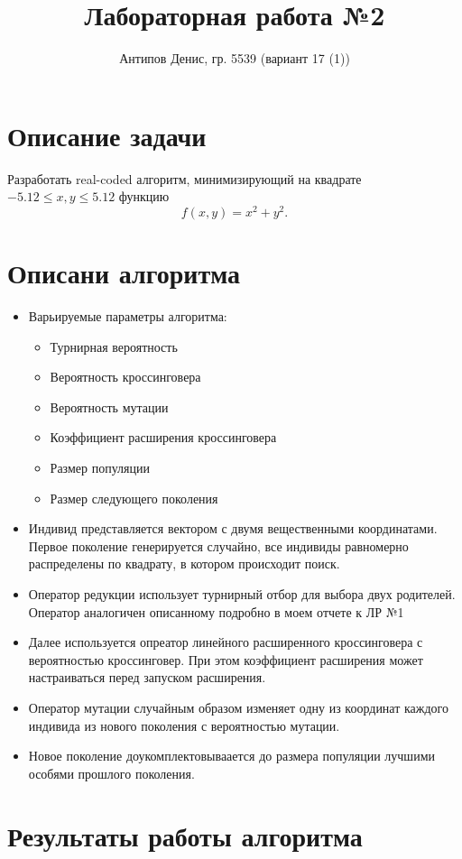 \documentclass[a4paper]{article}
\title{Лабораторная работа №2}
\author{Антипов Денис, гр. 5539 (вариант 17 (1))}
\begin{document}
\maketitle

\section{Описание задачи}

Разработать real-coded алгоритм, минимизирующий на квадрате $-5.12 \le x, y \le 5.12$ функцию
$$f(x, y) = x^2 + y^2.$$

\section{Описани алгоритма}
\begin{itemize}
\item Варьируемые параметры алгоритма:
\begin{itemize}
\item Турнирная вероятность
\item Вероятность кроссинговера
\item Вероятность мутации
\item Коэффициент расширения кроссинговера
\item Размер популяции
\item Размер следующего поколения
\end{itemize}
\item Индивид представляется вектором с двумя вещественными координатами. Первое поколение генерируется случайно, все индивиды равномерно распределены по квадрату, в котором происходит поиск.
\item Оператор редукции использует турнирный отбор для выбора двух родителей. Оператор аналогичен описанному подробно в моем отчете к ЛР №1
\item Далее используется опреатор линейного расширенного кроссинговера с вероятностью кроссинговер. При этом коэффициент расширения может настраиваться перед запуском расширения.
\item Оператор мутации случайным образом изменяет одну из координат каждого индивида из нового поколения с вероятностью мутации.
\item Новое поколение доукомплектовываается до размера популяции лучшими особями прошлого поколения.
\end{itemize}

\section{Результаты работы алгоритма}
\end{document}
